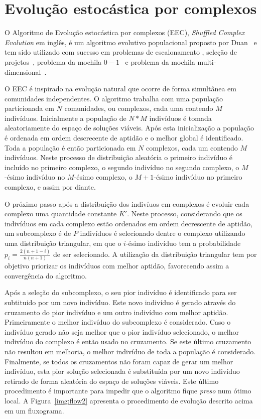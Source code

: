\section{Evolução estocástica por complexos}

O Algoritmo de Evolução estocástica por complexos (EEC),
\emph{Shuffled Complex Evolution} em inglês,
é um algoritmo evolutivo populacional proposto por Duan~\cite{duan1992effective}
e tem sido utilizado com sucesso em problemas de escalonamento
\cite{zhao2015shuffled}, seleção de projetos~\cite{elbeltagi2007modified},
problema da mochila $0-1$~\cite{bhattacharjee2014shuffled} e
problema da mochila multi-dimensional~\cite{baroni2015shuffled,baroni2016shuffled}.

O EEC é inspirado na evolução natural que ocorre de forma simultânea em
comunidades independentes.
O algoritmo trabalha com uma população particionada em $N$ comunidades,
ou complexos, cada uma contendo $M$ indivíduos.
Inicialmente a população de $N*M$ indivíduos é tomada aleatoriamente do espaço
de soluções viáveis.
Após esta inicialização a população é ordenada em ordem descrecente de aptidão
e o melhor global é identificado.
Toda a população é então particionada em $N$ complexos, cada um contendo $M$ indivíduos.
Neste processo de distribuição aleatória o primeiro indivíduo é incluído
no primeiro complexo, o segundo indivíduo no segundo complexo, o $M$-ésimo
indivíduo no $M$-ésimo complexo, o $M+1$-ésimo indivíduo no primeiro complexo,
e assim por diante.

O próximo passo após a distribuição dos indivíuos em complexos é evoluir cada
complexo uma quantidade constante $K'$.
Neste processo, considerando que os indivíduos em cada complexo estão ordenados
em ordem decrescente de aptidão, um subcomplexo é de $P$ indivíduos é selecionado
dentre o complexo utilizando uma distribuição triangular, em que o $i$-ésimo
indivíduo tem a probabilidade $p_i = \frac{2(n+1-i)}{n(n+1)}$ de ser selecionado.
A utilização da distribuição triangular tem por objetivo priorizar os indivíduos
com melhor aptidão, favorecendo assim a convergência do algoritmo.

Após a seleção do subcomplexo, o seu pior indivíduo é identificado para ser
subtituido por um novo indivíduo.
Este novo indivíduo é gerado através do cruzamento do pior indivíduo e um outro
indivíduo com melhor aptidão.
Primeiramente o melhor indivíduo do subcomplexo é considerado.
Caso o indivíduo gerado não seja melhor que o pior indivíduo selecionado,
o melhor indivíduo do complexo é então usado no cruzamento.
Se este último cruzamento não resultou em melhoria, o melhor indivíduo de toda
a população é considerado.
Finalmente, se todos os cruzamentos não foram capaz de gerar um melhor indivíduo,
esta pior solução selecionada é substituída por um novo indivíduo retirado de
forma aleatória do espaço de soluções viáveis.
Este último procedimento é importante para impedir que o algoritmo fique
\emph{preso} num ótimo local.
A Figura~\ref{img:flow2} apresenta o procedimento de evolução descrito acima
em um fluxograma.

